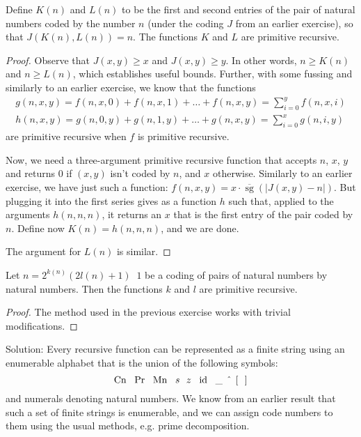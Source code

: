 \begin{exercise}[6.5]
  Define $K(n)$ and $L(n)$ to be the first and second entries of the pair of natural numbers coded by the number $n$ (under the coding $J$ from an earlier exercise), so that $J(K(n), L(n)) = n$.
  The functions $K$ and $L$ are primitive recursive.
\end{exercise}
\begin{proof}
  \newcommand{\sgb}{\overline{\operatorname{sg}}}
  Observe that $J(x,y)\ge x$ and $J(x,y)\ge y$.
  In other words, $n \ge K(n)$ and $n \ge L(n)$, which establishes useful bounds.
  Further, with some fussing and similarly to an earlier exercise, we know that the functions
  \begin{gather*}
    g(n,x,y)=f(n,x,0)+f(n,x,1)+\ldots+f(n,x,y)=\sum_{i=0}^y f(n,x,i)\\
    h(n,x,y)=g(n,0,y)+g(n,1,y)+\ldots+g(n,x,y)=\sum_{i=0}^x g(n,i,y)
  \end{gather*}
  are primitive recursive when $f$ is primitive recursive.

  Now, we need a three-argument primitive recursive function that accepts $n$, $x$, $y$ and returns $0$ if $(x,y)$ isn't coded by $n$, and $x$ otherwise.
  Similarly to an earlier exercise, we have just such a function: $f(n,x,y) = x \cdot \sgb(|J(x,y) - n|)$.
  But plugging it into the first series gives as a function $h$ such that, applied to the arguments $h(n,n,n)$, it returns an $x$ that is the first entry of the pair coded by $n$.
  Define now $K(n)=h(n,n,n)$, and we are done.

  The argument for $L(n)$ is similar.
\end{proof}

\begin{exercise}[6.6]
  Let $n=2^{k(n)}(2l(n)+1)\mathop{\dot -}1$ be a coding of pairs of natural numbers by natural numbers.
  Then the functions $k$ and $l$ are primitive recursive.
\end{exercise}
\begin{proof}
  The method used in the previous exercise works with trivial modifications.
\end{proof}

\begin{exercise}[6.7]
  Solution: Every recursive function can be represented as a finite string using an enumerable alphabet that is the union of the following symbols:
  \begin{equation*}
    \operatorname{Cn}~~\Pr~~\operatorname{Mn}~~s~~z~~\operatorname{id}~~\_~~\hat{}~~[~~]
  \end{equation*}
  and numerals denoting natural numbers.
  We know from an earlier result that such a set of finite strings is enumerable, and we can assign code numbers to them using the usual methods, e.g. prime decomposition.
\end{exercise}

